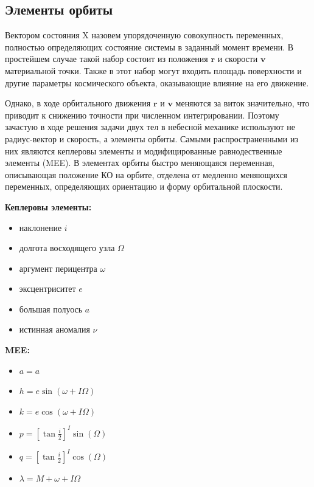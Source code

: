 \subsection{Элементы орбиты}
Вектором состояния X назовем упорядоченную совокупность переменных, полностью определяющих состояние системы в заданный момент времени.
В простейшем случае такой набор состоит из положения $\mathbf{r}$ и скорости $\mathbf{v}$ материальной точки. 
Также в этот набор могут входить площадь поверхности и другие параметры космического объекта, оказывающие влияние на его движение.

Однако, в ходе орбитального движения $\mathbf{r}$ и $\mathbf{v}$ меняются за виток значительно, что приводит к снижению точности при численном интегрировании.
Поэтому зачастую в ходе решения задачи двух тел в небесной механике используют не радиус-вектор и скорость, а элементы орбиты.
Самыми распространенными из них являются кеплеровы элементы и модифицированные равнодественные элементы (MEE).
В элементах орбиты быстро меняющаяся переменная, описывающая положение КО на орбите, отделена от медленно меняющихся переменных,
определяющих ориентацию и форму орбитальной плоскости.
\begin{center}
    \begin{minipage}[t]{0.45\textwidth}
        \vspace{0pt}
        \textbf{Кеплеровы элементы:}
        \begin{itemize}
            \item наклонение $i$
            \item долгота восходящего узла $\Omega$
            \item аргумент перицентра $\omega$
            \item эксцентриситет $e$
            \item большая полуось $a$
            \item истинная аномалия $\nu$
        \end{itemize}
    \end{minipage}
    \hspace{1cm}
    \begin{minipage}[t]{0.45\textwidth}
        \vspace{0pt}
        \textbf{MEE:}
        \begin{itemize}
            \item $a = a$
            \item $h = e \sin\left(\omega + I \Omega \right)$
            \item $k = e \cos\left(\omega + I \Omega \right)$
            \item $p = \left[\tan{\frac{i}{2}}\right]^I \sin(\Omega)$
            \item $q = \left[\tan{\frac{i}{2}}\right]^I \cos(\Omega)$
            \item $\lambda = M + \omega + I \Omega$
        \end{itemize}
    \end{minipage}
\end{center}


